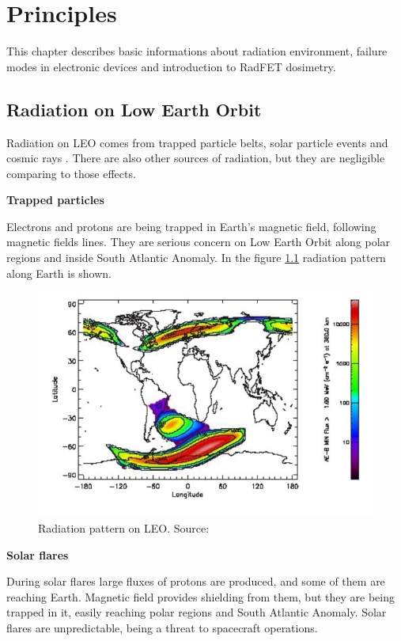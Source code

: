 \chapter{Principles}

This chapter describes basic informations about radiation environment, failure modes in electronic devices and introduction to RadFET dosimetry.

\section{Radiation on Low Earth Orbit}
    Radiation on LEO comes from trapped particle belts, solar particle events and cosmic rays \cite{ESA_radiation}. There are also other sources of radiation, but they are negligible comparing to those effects.

    \bigskip \textbf{Trapped particles}

    Electrons and protons are being trapped in Earth's magnetic field, following magnetic fields lines. They are serious concern on Low Earth Orbit along polar regions and inside South Atlantic Anomaly. In the figure \ref{Polar_SAA} radiation pattern along Earth is shown.

    \begin{figure}[H]
        \centering
        \includegraphics[width=0.6\paperwidth]{img/03/polar_SAA.png}
        \caption{Radiation pattern on LEO. Source: \cite{ESA_radiation}}
        \label{Polar_SAA}
    \end{figure}

    \bigskip \textbf{Solar flares}

    During solar flares large fluxes of protons are produced, and some of them are reaching Earth. Magnetic field provides shielding from them, but they are being trapped in it, easily reaching polar regions and South Atlantic Anomaly. Solar flares are unpredictable, being a threat to spacecraft operations.

